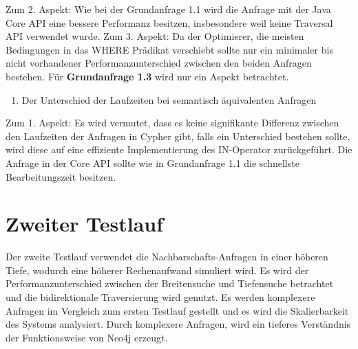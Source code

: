 Zum 2. Aspekt: Wie bei der Grundanfrage 1.1 wird   die Anfrage mit der Java Core API eine bessere Performanz besitzen, insbesondere weil keine Traversal API verwendet wurde. \newline
Zum 3. Aspekt: Da der Optimierer, die meisten Bedingungen in das WHERE Prädikat verschiebt sollte nur ein minimaler bis nicht vorhandener Performanzunterschied zwischen den beiden Anfragen bestehen. \newline \newline
Für \textbf{Grundanfrage 1.3} wird nur ein Aspekt betrachtet.
\begin{enumerate}
	\item Der Unterschied der Laufzeiten bei semantisch äquivalenten Anfragen 
\end{enumerate}
Zum 1. Aspekt: Es wird vermutet, dass es keine signifikante Differenz zwischen den Laufzeiten der Anfragen in Cypher gibt, falls ein Unterschied bestehen sollte, wird diese auf eine effiziente Implementierung des IN-Operator zurückgeführt. Die Anfrage in der Core API sollte wie in Grundanfrage 1.1 die schnellste Bearbeitungszeit besitzen.

\section{Zweiter Testlauf}
Der zweite Testlauf verwendet die Nachbarschafts-Anfragen in einer höheren Tiefe, wodurch eine höherer Rechenaufwand simuliert wird. Es wird der Performanzunterschied zwischen der Breitensuche und Tiefensuche betrachtet und die bidirektionale Traversierung wird genutzt. Es werden komplexere Anfragen im Vergleich zum ersten Testlauf gestellt und es wird die Skalierbarkeit des Systems analysiert. Durch komplexere Anfragen, wird ein tieferes Verständnis der Funktionsweise von Neo4j erzeugt. 
